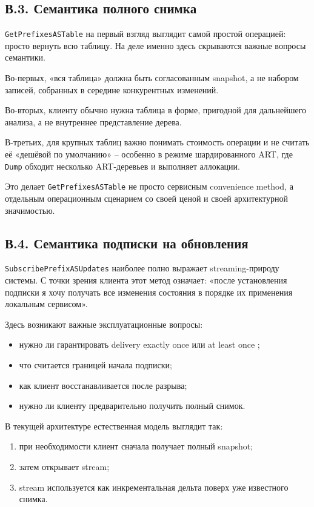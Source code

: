 \subsection*{В.3. Семантика полного снимка}

\texttt{GetPrefixesASTable} на первый взгляд выглядит самой простой
операцией: просто вернуть всю таблицу. На деле именно здесь скрываются
важные вопросы семантики.

Во-первых, «вся таблица» должна быть согласованным snapshot, а не
набором записей, собранных в середине конкурентных изменений.

Во-вторых, клиенту обычно нужна таблица в форме, пригодной для
дальнейшего анализа, а не внутреннее представление дерева.

В-третьих, для крупных таблиц важно понимать стоимость операции и не
считать её «дешёвой по умолчанию» -- особенно в режиме шардированного
ART, где \texttt{Dump} обходит несколько ART-деревьев и выполняет
аллокации.

Это делает \texttt{GetPrefixesASTable} не просто сервисным
convenience method, а отдельным операционным сценарием со своей
ценой и своей архитектурной значимостью.

\subsection*{В.4. Семантика подписки на обновления}

\texttt{SubscribePrefixASUpdates} наиболее полно выражает
streaming-природу системы. С точки зрения клиента этот метод
означает: «после установления подписки я хочу получать все изменения
состояния в порядке их применения локальным сервисом».

Здесь возникают важные эксплуатационные вопросы:

\begin{itemize}
\item нужно ли гарантировать delivery exactly once или at least once
\cite{kreps2011kafka};
\item что считается границей начала подписки;
\item как клиент восстанавливается после разрыва;
\item нужно ли клиенту предварительно получить полный снимок.
\end{itemize}

В текущей архитектуре естественная модель выглядит так:

\begin{enumerate}
\item при необходимости клиент сначала получает полный snapshot;
\item затем открывает stream;
\item stream используется как инкрементальная дельта поверх уже
известного снимка.
\end{enumerate}

